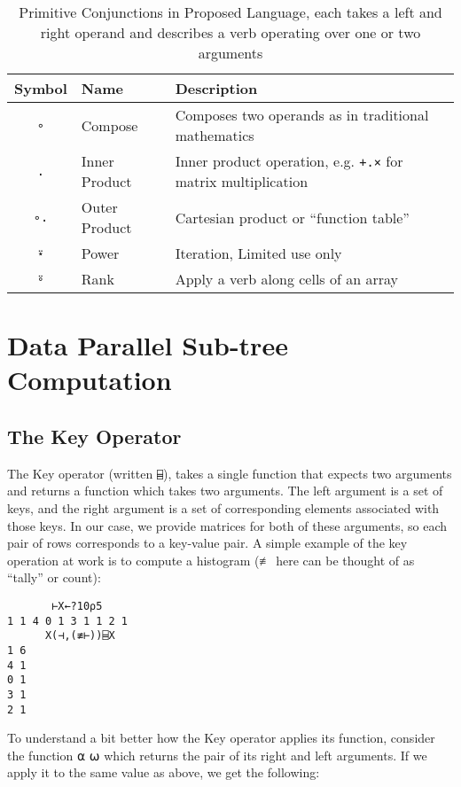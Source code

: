 \documentclass[numbers,preprint]{sigplanconf}
\begin{document}
\begin{table*}
\centering
\begin{tabular}{cll}
\toprule
Symbol     & Name & Description \\
\midrule
\texttt{∘} & Compose & Composes two operands as in traditional mathematics \\
\texttt{.} & Inner Product & Inner product operation, e.g.
 \texttt{+.×} for matrix multiplication \\
\texttt{∘.} & Outer Product & Cartesian product or ``function table'' \\
\texttt{⍣} & Power & Iteration, Limited use only \\
\texttt{⍤} & Rank & Apply a verb along cells of an array \\
\end{tabular}
\caption{Primitive Conjunctions in Proposed Language, each takes a left
 and right operand and describes a verb operating over one or two arguments}
\label{tab:conjunctions}
\end{table*}

\section{Data Parallel Sub-tree Computation}

\subsection{The Key Operator}

The Key operator (written \verb;⌸;), takes a single function that expects two arguments and returns 
a function which takes two arguments. The left argument is a set of keys, and the right argument 
is a set of corresponding elements associated with those keys. In our case, we provide matrices 
for both of these arguments, so each pair of rows corresponds to a key-value pair. A simple example 
of the key operation at work is to compute a histogram (≢ here can be thought of as “tally” or count):

\begin{verbatim}
       ⊢X←?10⍴5
1 1 4 0 1 3 1 1 2 1
      X(⊣,(≢⊢))⌸X
1 6
4 1
0 1
3 1
2 1
\end{verbatim}

To understand a bit better how the Key operator applies its function, consider the function {⍺ ⍵} 
which returns the pair of its right and left arguments. If we apply it to the same value as above, we 
get the following:
\end{document}
